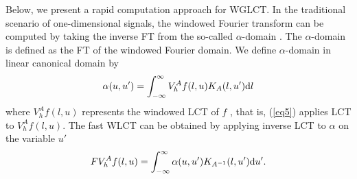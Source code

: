 \documentclass[lettersize,journal]{IEEEtran}
\begin{document}
Below, we present a rapid computation approach for WGLCT.
In the traditional scenario of one-dimensional signals, the windowed Fourier transform can be computed by taking the inverse FT from the so-called $\alpha$-domain \cite{yan2021windowed, brown2009general, jestrovic2017fast}. The $\alpha$-domain is defined as the FT of the windowed Fourier domain. 
We define $\alpha$-domain in linear canonical domain by
\begin{align}
	\label{eq5}
	\alpha(u,u')=  \int_{-\infty}^{\infty} V_h^{A} f(l, u) K_{A}(l, u') {\rm d} l
\end{align}
where $V_h^{A} f(l, u)$ represents the windowed LCT of $f$ \cite{kou2012windowed}, that is, (\ref{eq5}) applies LCT to $V_h^{A} f(l, u)$. The fast WLCT can be obtained by applying inverse LCT to $\alpha$ on the variable $u'$
\begin{align}
	FV_h^{A} f(l, u) = \int_{-\infty}^{\infty} \alpha(u,u') K_{A^{-1}}(l, u') {\rm d} u'.
\end{align}
\end{document}
